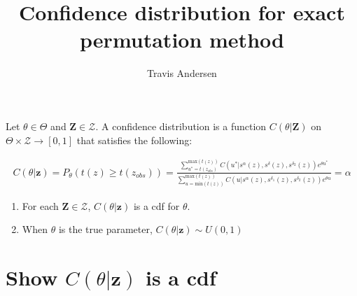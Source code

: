 \documentclass{article}
\title{Confidence distribution for exact permutation method}
\author{Travis Andersen}
\begin{document}
\maketitle  

Let $\theta \in \Theta$ and $\textbf{Z} \in \mathcal{Z}$. A confidence distribution is a function $C(\theta|\textbf{Z})$ on $\Theta \times \mathcal{Z} \to [0, 1]$ that satisfies the following:

\begin{align*}
  C(\theta|\textbf{z}) = P_\theta(t(z) \geq t(z_{obs})) = \frac
  {\sum_{u^*=t(z_{obs})}^{\text{max}(t(z))} C(u^*|s^\alpha(z), s^\delta(z), s^{\delta_2}(z))e^{\theta u^*}}
  {\sum_{u=\text{min}(t(z))}^{\text{max}(t(z))} C(u|s^\alpha(z), s^{\delta_1}(z), s^{\delta_2}(z))e^{\theta u}}
  = \alpha
\end{align*}

\begin{enumerate}
  \item For each $\textbf{Z} \in \mathcal{Z}$, $C(\theta|\textbf{z})$ is a cdf for $\theta$. 
  \item When $\theta$ is the true parameter, $C(\theta|\textbf{z}) \sim U(0, 1)$
\end{enumerate}

\section{Show $C(\theta|\textbf{z})$ is a cdf}
\end{document}
